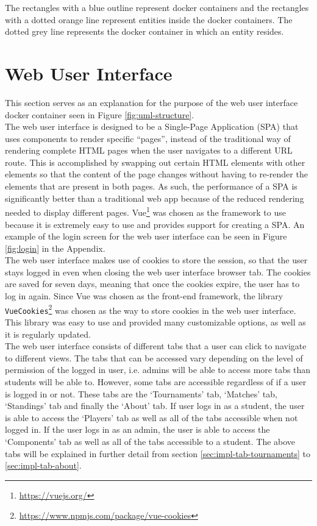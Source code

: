 \documentclass[a4paper, 11pt]{report}
\begin{document}
The rectangles with a blue outline represent docker containers and the rectangles
with a dotted orange line represent entities inside the docker containers. The
dotted grey line represents the docker container in which an entity resides.

\section{Web User Interface}
\label{sec:impl-web-interface}

This section serves as an explanation for the purpose of the web user interface
docker container seen in Figure \ref{fig:uml-structure}. \\

The web user interface is designed to be a Single-Page Application (SPA) that
uses components to render specific ``pages'', instead of the traditional way of
rendering complete HTML pages when the user navigates to a different URL route.
This is accomplished by swapping out certain HTML elements with other elements
so that the content of the page changes without having to re-render the elements
that are present in both pages. As such, the performance of a SPA is significantly
better than a traditional web app because of the reduced rendering needed to
display different pages. Vue\footnote{\url{https://vuejs.org/}} was chosen as the
framework to use because it is extremely easy to use and provides support for
creating a SPA. An example of the login screen for the web user interface can be
seen in Figure \ref{fig:login} in the Appendix. \\

The web user interface makes use of cookies to store the session, so that the
user stays logged in even when closing the web user interface browser tab. The
cookies are saved for seven days, meaning that once the cookies expire, the
user has to log in again. Since Vue was chosen as the front-end framework, the
library \texttt{VueCookies}\footnote{\url{https://www.npmjs.com/package/vue-cookies}}
was chosen as the way to store cookies in the web user interface. This library
was easy to use and provided many customizable options, as well as it is
regularly updated. \\

The web user interface consists of different tabs that a user can click to navigate
to different views. The tabs that can be accessed vary depending on the level of
permission of the logged in user, i.e. admins will be able to access more tabs
than students will be able to. However, some tabs are accessible regardless of
if a user is logged in or not. These tabs are the `Tournaments' tab, `Matches'
tab, `Standings' tab and finally the `About' tab. If user logs in as a student,
the user is able to access the `Players' tab as well as all of the tabs
accessible when not logged in. If the user logs in as an admin, the user is able
to access the `Components' tab as well as all of the tabs accessible to a student.
The above tabs will be explained in further detail from section
\ref{sec:impl-tab-tournaments} to \ref{sec:impl-tab-about}.
\end{document}
